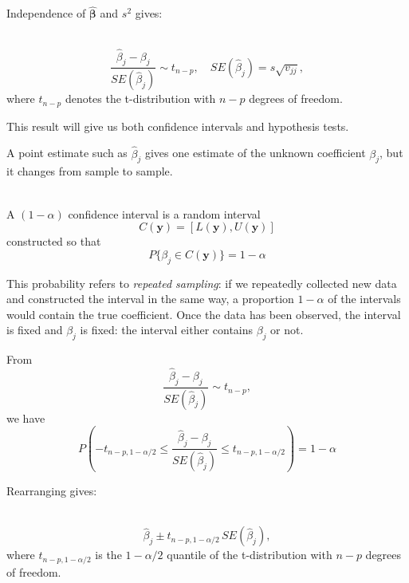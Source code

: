 Independence of $\hat{\bm\beta}$ and $s^2$ gives:

\begin{result} \leavevmode\\
    \begin{equation*}
        \frac{\hat\beta_j - \beta_j}{SE(\hat\beta_j)} \sim t_{n-p}, \quad SE(\hat\beta_j) = s\sqrt{v_{jj}},
    \end{equation*}
    where $t_{n-p}$ denotes the t-distribution with $n-p$ degrees of freedom.
\end{result}

This result will give us both confidence intervals and hypothesis tests. \newline

A point estimate such as $\hat\beta_j$ gives one estimate of the unknown coefficient $\beta_j$, but it changes from sample to sample.

\begin{definition}\leavevmode\\
    A $(1-\alpha)$ confidence interval is a random interval
    \begin{equation*}
        C(\mathbf{y})=[L(\mathbf{y}),U(\mathbf{y})]
    \end{equation*}
    constructed so that
    \begin{equation*}
        P\{\beta_j \in C(\mathbf{y})\} = 1 - \alpha
    \end{equation*}
\end{definition}

This probability refers to \textit{repeated sampling}: if we repeatedly collected new data and constructed the interval in the same way, a proportion $1-\alpha$ of the intervals would contain the true coefficient. Once the data has been observed, the interval is fixed and $\beta_j$ is fixed: the interval either contains $\beta_j$ or not. \newline

From
\begin{equation*}
    \frac{\hat\beta_j - \beta_j}{SE(\hat\beta_j)} \sim t_{n-p},
\end{equation*}
we have
\begin{equation*}
    P\left(-t_{n-p,1-\alpha/2} \leq \frac{\hat\beta_j - \beta_j}{SE(\hat\beta_j)} \leq t_{n-p,1-\alpha/2}\right) = 1-\alpha
\end{equation*}

Rearranging gives:

\begin{result} \leavevmode\\
    \begin{equation*}
        \hat\beta_j \pm t_{n-p,1-\alpha/2}\,SE(\hat\beta_j),
    \end{equation*}
    where $t_{n-p,1-\alpha/2}$ is the $1-\alpha/2$ quantile of the t-distribution with $n-p$ degrees of freedom.
\end{result}

